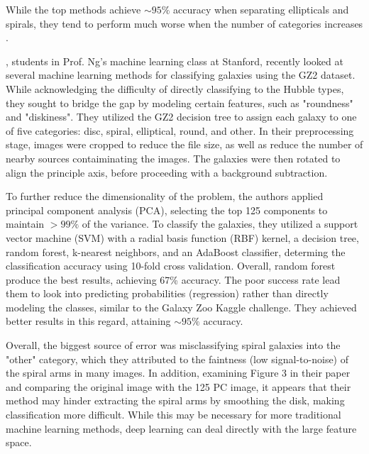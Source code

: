 \documentclass{article}
\begin{document}
While the top methods achieve $\sim95\%$ accuracy when separating ellipticals and spirals, they tend to perform much worse when the number of categories increases \citep{2004MNRAS.349...87D}.


\cite{stanford}, students in Prof. Ng's machine learning class at Stanford, recently looked at several machine learning methods for classifying galaxies using the GZ2 dataset. While acknowledging the difficulty of directly classifying to the Hubble types, they sought to bridge the gap by modeling certain features, such as "roundness" and "diskiness". They utilized the GZ2 decision tree to assign each galaxy to one of five categories: disc, spiral, elliptical, round, and other. In their preprocessing stage, images were cropped to reduce the file size, as well as reduce the number of nearby sources contaiminating the images. The galaxies were then rotated to align the principle axis, before proceeding with a background subtraction.

To further reduce the dimensionality of the problem, the authors applied principal component analysis (PCA), selecting the top 125 components to maintain $>99\%$ of the variance. To classify the galaxies, they utilized a support vector machine (SVM) with a radial basis function (RBF) kernel, a decision tree, random forest, k-nearest neighbors, and an AdaBoost classifier, determing the classification accuracy using 10-fold cross validation. Overall, random forest produce the best results, achieving 67\% accuracy. The poor success rate lead them to look into predicting probabilities (regression) rather than directly modeling the classes, similar to the Galaxy Zoo Kaggle challenge. They achieved better results in this regard, attaining $\sim 95\%$ accuracy.

Overall, the biggest source of error was misclassifying spiral galaxies into the "other" category, which they attributed to the faintness (low signal-to-noise) of the spiral arms in many images. In addition, examining Figure 3 in their paper and comparing the original image with the 125 PC image, it appears that their method may hinder extracting the spiral arms by smoothing the disk, making classification more difficult. While this may be necessary for more traditional machine learning methods, deep learning can deal directly with the large feature space.
\end{document}
